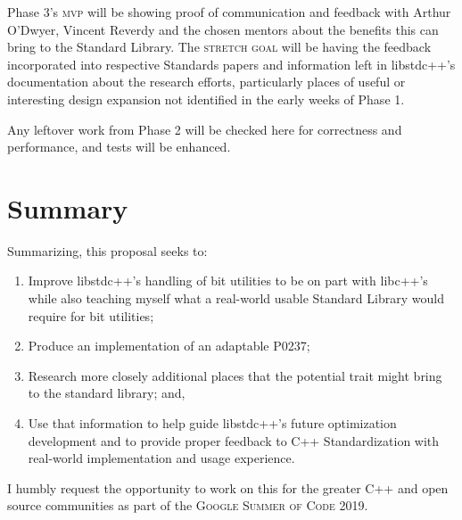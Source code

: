 \documentclass{wg21}
\begin{document}
Phase 3's \textsc{mvp} will be showing proof of communication and feedback with Arthur O'Dwyer, Vincent Reverdy and the chosen mentors about the benefits this can bring to the Standard Library. The \textsc{stretch goal} will be having the feedback incorporated into respective Standards papers and information left in libstdc++'s documentation about the research efforts, particularly places of useful or interesting design expansion not identified in the early weeks of Phase 1.

Any leftover work from Phase 2 will be checked here for correctness and performance, and tests will be enhanced.


\section[summary]{Summary}

Summarizing, this proposal seeks to:

\begin{enumerate}
	\item Improve libstdc++'s handling of bit utilities to be on part with libc++'s while also teaching myself what a real-world usable Standard Library would require for bit utilities;
	\item Produce an implementation of an adaptable P0237;
	\item Research more closely additional places that the potential trait  might bring to the standard library; and,
	\item Use that information to help guide libstdc++'s future optimization development and to provide proper feedback to C++ Standardization with real-world implementation and usage experience.
\end{enumerate}

I humbly request the opportunity to work on this for the greater C++ and open source communities as part of the \textsc{Google Summer of Code 2019}.



\end{document}
